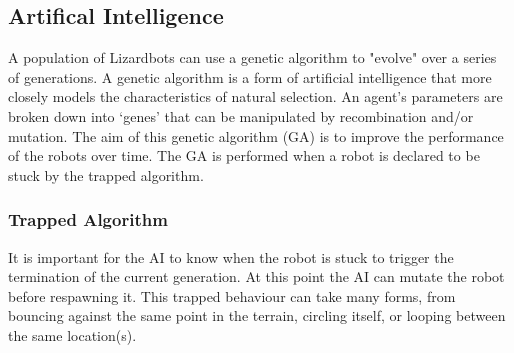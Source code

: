 \documentclass{article}
\begin{document}
\subsection{Artifical Intelligence}
A population of Lizardbots can use a genetic algorithm to "evolve" over a series of generations. A genetic algorithm is a form of artificial intelligence that more closely models the characteristics of natural selection. An agent’s parameters are broken down into ‘genes’ that can be manipulated by recombination and/or mutation. The aim of this genetic algorithm (GA) is to improve the performance of the robots over time. The GA is performed when a robot is declared to be stuck by the trapped algorithm. 

\subsubsection{Trapped Algorithm}
It is important for the AI to know when the robot is stuck to trigger the termination of the current generation. At this point the AI can mutate the robot before respawning it. This trapped behaviour can take many forms, from bouncing against the same point in the terrain, circling itself, or looping between the same location(s).\\
\end{document}

